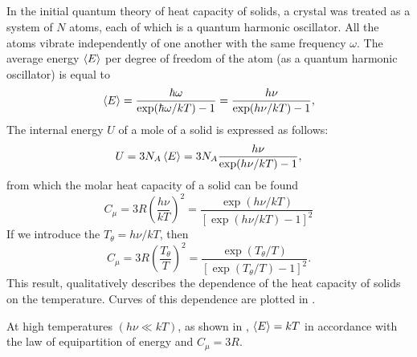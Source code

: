 \subsection{}\label{41.7.3} In the initial quantum theory of heat capacity of solids, a crystal was treated as a system of $N$ atoms, each of which is a quantum harmonic oscillator. All the atoms vibrate independently of one another with the same frequency $\omega$. The average energy $\expval{E}$ per degree of freedom of the atom (as a quantum harmonic oscillator) is equal  to
\begin{equation*}%
\expval{E} = \frac{\hbar \omega}{\exp (\hbar \omega/kT) - 1}
= \frac{h \nu}{\exp (h \nu /kT) - 1},
\end{equation*}
The internal energy $U$  of a mole of a solid is expressed as follows:
\begin{equation*}%
U = 3 N_{A} \expval{E} = 3 N_{A} \frac{h \nu}{\exp (h \nu /kT) - 1},
\end{equation*}
from which the molar heat capacity of a solid can be found
\begin{equation*}%
C_{\mu} = 3 R \left( \frac{h \nu}{kT} \right)^{2} = \frac{\exp (h \nu /kT)}{[\exp (h \nu /kT) - 1]^{2}}
\end{equation*}
If we introduce the  $T_{\theta} = h\nu/kT$, then 
\begin{equation*}%
C_{\mu} = 3 R \left( \frac{T_{\theta}}{T} \right)^{2} = \frac{\exp (T_{\theta}/T)}{[\exp (T_{\theta}/T) - 1]^{2}}.
\end{equation*}
This result, qualitatively describes the dependence of the heat capacity of solids on the temperature. Curves of this dependence are plotted in .

At high temperatures $(h \nu \ll kT)$, as shown in , $\expval{E}  = kT$ in accordance with the law of equipartition of energy  and $C_{\mu} = 3R$.


